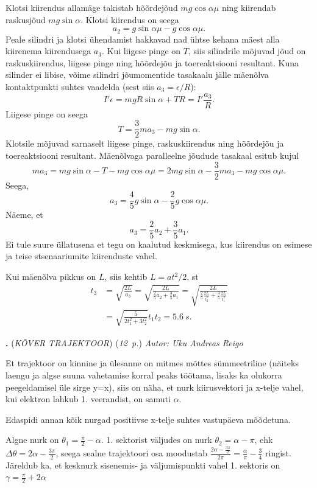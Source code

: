 \documentclass[11pt,a5paper]{article}
\newcommand{\numb}[1]{\vspace{5pt}\textbf{\large #1}}
\newcommand{\nimi}[1]{(\textsl{\small #1})}
\newcommand{\punktid}[1]{(\emph{#1~p.})}
\newcounter{ylesanne}
\newcommand{\yl}[1]{\addtocounter{ylesanne}{1}\numb{\theylesanne.} \nimi{#1} \newblock{}}
\newcommand{\autor}[1]{\emph{ Autor: #1}}%
\begin{document}
Klotsi kiirendus allamäge takistab hõõrdejõud $mg\cos\alpha \mu$ ning kiirendab raskusjõud $mg\sin\alpha$. Klotsi kiirendus on seega
\[
a_2 = g\sin\alpha\mu - g\cos\alpha\mu.
\]
Peale silindri ja klotsi ühendamist hakkavad nad ühtse kehana mäest alla kiirenema kiirendusega $a_3$. Kui liigese pinge on $T$, siis silindrile mõjuvad jõud on raskuskiirendus, liigese pinge ning hõõrdejõu ja toereaktsiooni resultant. Kuna silinder ei libise, võime silindri jõumomentide tasakaalu jälle mäenõlva kontaktpunkti suhtes vaadelda (sest siis $a_3 = \epsilon / R$):
\[
I'\epsilon = mgR\sin\alpha + TR = I'\frac{a_3}{R}.
\]
Liigese pinge on seega
\[
T = \frac{3}{2}ma_3 - mg\sin\alpha.
\]
Klotsile mõjuvad sarnaselt liigese pinge, raskuskiirendus ning hõõrdejõu ja toereaktsiooni resultant. Mäenõlvaga paralleelne jõudude tasakaal esitub kujul
\[
ma_3 = mg\sin\alpha - T - mg\cos\alpha\mu = 2mg\sin\alpha - \frac{3}{2}ma_3 - mg\cos\alpha\mu.
\]
Seega,
\[
a_3 = \frac{4}{5}g\sin\alpha - \frac{2}{5}g\cos\alpha\mu.
\]
Näeme, et
\[
a_3 = \frac{2}{5}a_2 + \frac{3}{5}a_1.
\]
Ei tule suure üllatusena et tegu on kaalutud keskmisega, kus kiirendus on esimese ja teise stsenaariumite kiirenduste vahel.

Kui mäenõlva pikkus on $L$, siis kehtib $L = at^2/2$, st
\begin{align*}
t_3 &= \sqrt{\frac{2L}{a_3}} = \sqrt{\frac{2L}{\frac{2}{5}a_2 + \frac{3}{5}a_1}} = \sqrt{\frac{2L}{\frac{2}{5}\frac{2L}{t_2^2} + \frac{3}{5}\frac{2L}{t_1^2}}}\\
&= \sqrt{\frac{5}{2t_1^2+3t_2^2}}t_1t_2 = \SI{5.6}{s}.
\end{align*}

\pagebreak
\yl{KÕVER TRAJEKTOOR}
\punktid{12} \autor{Uku Andreas Reigo}

Et trajektoor on kinnine ja ülesanne on mitmes mõttes sümmeetriline (näiteks laengu ja algse suuna vahetamise korral peaks töötama, lisaks ka olukorra peegeldamisel üle sirge y=x), siis on näha, et nurk kiirusvektori ja x-telje vahel, kui elektron lahkub 1. veerandist, on samuti $\alpha$.

Edaspidi annan kõik nurgad positiivse x-telje suhtes vastupäeva mõõdetuna. 

Algne nurk on $\theta_1 = \frac{\pi}{2} - \alpha$. 1. sektorist väljudes on nurk $\theta_2 = \alpha - \pi$, ehk $\Delta\theta = 2\alpha - \frac{3\pi}{2}$, seega sealne trajektoori osa moodustab $\frac{2\alpha-\frac{3\pi}{2}}{2\pi} = \frac{\alpha}{\pi} - \frac{3}{4}$ ringist. Järeldub ka, et kesknurk sisenemis- ja väljumispunkti vahel 1. sektoris on $\gamma = \frac{\pi}{2} + 2\alpha$
\end{document}
